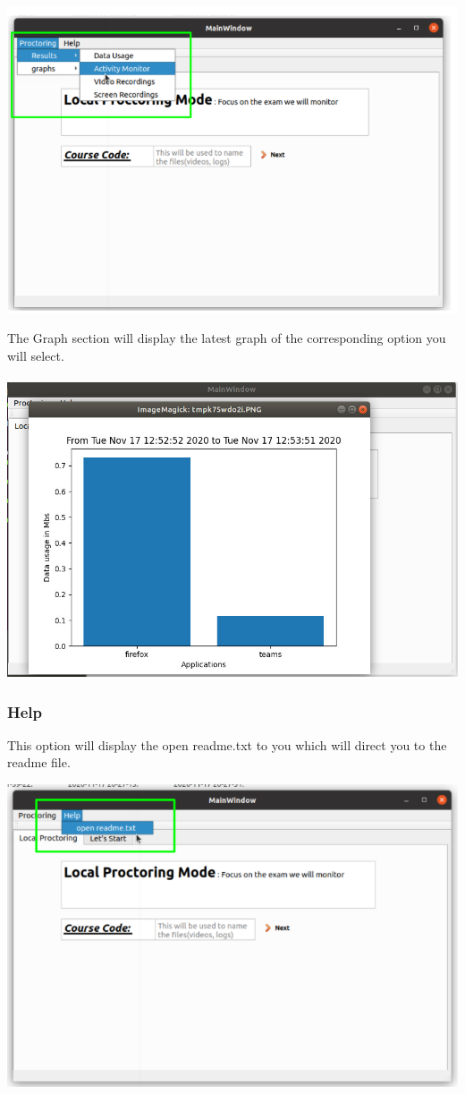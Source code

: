 \documentclass{article}
\begin{document}
\begin{center}
\includegraphics[scale=0.8]{menubar.png}    
\end{center}
\newpage
The Graph section will display the latest graph of the corresponding option you will select.\\\\
\includegraphics[scale=0.5]{Screenshot from 2020-11-17 14-13-03.png}
\newpage
\subsubsection{Help}
This option will display the open readme.txt to you which will direct you to the readme file.\\
\begin{center}
\includegraphics[scale=0.8]{Help.png}    
\end{center}
\end{document}
